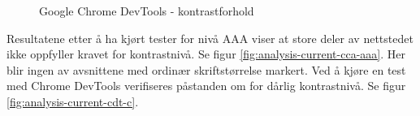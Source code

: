 \begin{figure}[H]
    \begin{center}
        \caption{Google Chrome DevTools - kontrastforhold}
        \label{fig:analysis-current-cdt}
    \end{center}
\end{figure}

Resultatene etter å ha kjørt tester for nivå AAA viser at store deler av nettstedet ikke oppfyller kravet for kontrastnivå. Se figur \ref{fig:analysis-current-cca-aaa}. Her blir ingen av avsnittene med ordinær skriftstørrelse markert. Ved å kjøre en test med Chrome DevTools verifiseres påstanden om for dårlig kontrastnivå. Se figur \ref{fig:analysis-current-cdt-c}.

